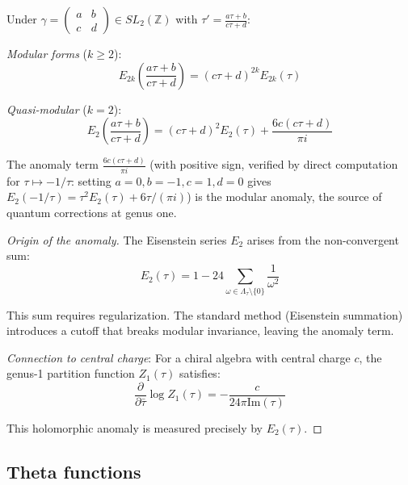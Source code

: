 \begin{theorem}
\label{thm:modular-vs-quasi}
Under $\gamma = \begin{pmatrix} a & b \\ c & d \end{pmatrix} \in SL_2(\mathbb{Z})$ with $\tau' = \frac{a\tau+b}{c\tau+d}$:

\emph{Modular forms} ($k \geq 2$):
\begin{equation}
E_{2k}\left(\frac{a\tau+b}{c\tau+d}\right) = (c\tau + d)^{2k} E_{2k}(\tau)
\end{equation}

\emph{Quasi-modular} ($k=2$):
\begin{equation}
E_2\left(\frac{a\tau+b}{c\tau+d}\right) = (c\tau + d)^2 E_2(\tau) + \frac{6c(c\tau+d)}{\pi i}
\end{equation}

The anomaly term $\frac{6c(c\tau+d)}{\pi i}$ (with positive sign, verified by direct computation for $\tau \mapsto -1/\tau$: setting $a=0,b=-1,c=1,d=0$ gives $E_2(-1/\tau) = \tau^2 E_2(\tau) + 6\tau/(\pi i)$) is the modular anomaly, the source of quantum corrections at genus one.
\end{theorem}

\begin{proof}[Origin of the anomaly]
The Eisenstein series $E_2$ arises from the non-convergent sum:
\begin{equation}
E_2(\tau) = 1 - 24\sum_{\omega \in \Lambda_\tau \setminus \{0\}} \frac{1}{\omega^2}
\end{equation}

This sum requires regularization. The standard method (Eisenstein summation) introduces a cutoff that breaks modular invariance, leaving the anomaly term.

\emph{Connection to central charge}: For a chiral algebra with central charge $c$, the genus-1
partition function $Z_1(\tau)$ satisfies:
\begin{equation}
\frac{\partial}{\partial \bar{\tau}} \log Z_1(\tau) = -\frac{c}{24\pi \text{Im}(\tau)}
\end{equation}

This holomorphic anomaly is measured precisely by $E_2(\tau)$.
\end{proof}

\subsection{Theta functions}

